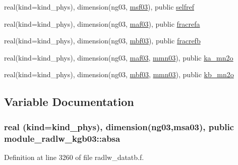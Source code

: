 \begin{DoxyCompactItemize}
\item 
real(kind=kind\+\_\+phys), dimension(ng03, \hyperlink{namespacemodule__radlw__kgb03_af553bb46aa3ea6bcbb945cb2c2778955}{msf03}), public \hyperlink{namespacemodule__radlw__kgb03_a6bb40d898660e6dfc056d3efe1d0c544}{selfref}
\item 
real(kind=kind\+\_\+phys), dimension(ng03, \hyperlink{namespacemodule__radlw__kgb03_a90d1081db011f0682cb4a83c40c5bb23}{maf03}), public \hyperlink{namespacemodule__radlw__kgb03_a26e901a002e789933c5c9b622f3a0932}{fracrefa}
\item 
real(kind=kind\+\_\+phys), dimension(ng03, \hyperlink{namespacemodule__radlw__kgb03_a655fff8711d78d62ae9d4fa27d02621a}{mbf03}), public \hyperlink{namespacemodule__radlw__kgb03_af1d33a7362e73bf40ef592bc9863b612}{fracrefb}
\item 
real(kind=kind\+\_\+phys), dimension(ng03, \hyperlink{namespacemodule__radlw__kgb03_a90d1081db011f0682cb4a83c40c5bb23}{maf03}, \hyperlink{namespacemodule__radlw__kgb03_ab4e84b10460930267256c0e5a1fe7a55}{mmn03}), public \hyperlink{namespacemodule__radlw__kgb03_aeeba4e0a8fc97c557e1127b4d5d1bd94}{ka\+\_\+mn2o}
\item 
real(kind=kind\+\_\+phys), dimension(ng03, \hyperlink{namespacemodule__radlw__kgb03_a655fff8711d78d62ae9d4fa27d02621a}{mbf03}, \hyperlink{namespacemodule__radlw__kgb03_ab4e84b10460930267256c0e5a1fe7a55}{mmn03}), public \hyperlink{namespacemodule__radlw__kgb03_aa2442e663e83b222648a86a34cd6631c}{kb\+\_\+mn2o}
\end{DoxyCompactItemize}


\subsection{Variable Documentation}
\subsubsection[{\texorpdfstring{absa}{absa}}]{\setlength{\rightskip}{0pt plus 5cm}real (kind=kind\+\_\+phys), dimension(ng03,{\bf msa03}), public module\+\_\+radlw\+\_\+kgb03\+::absa}\hypertarget{namespacemodule__radlw__kgb03_ac65fd4afedbd4bfa2c87c5e4f060a1d4}{}\label{namespacemodule__radlw__kgb03_ac65fd4afedbd4bfa2c87c5e4f060a1d4}


Definition at line 3260 of file radlw\+\_\+datatb.\+f.



